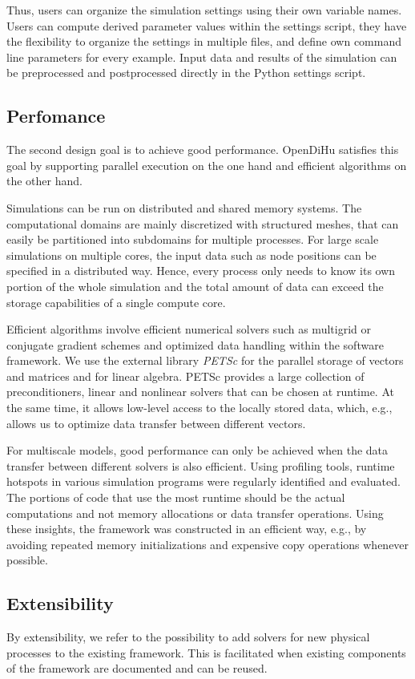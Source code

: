 Thus, users can organize the simulation settings using their own variable names.
Users can compute derived parameter values within the settings script, they have the flexibility to organize the settings in multiple files, and define own command line parameters for every example. Input data and results of the simulation can be preprocessed and postprocessed directly in the Python settings script.

\subsection{Perfomance}
The second design goal is to achieve good performance.
OpenDiHu satisfies this goal by supporting parallel execution on the one hand and efficient algorithms on the other hand. 

Simulations can be run on distributed and shared memory systems. The computational domains are mainly discretized with structured meshes, that can easily be partitioned into subdomains for multiple processes. For large scale simulations on multiple cores, the input data such as node positions can be specified in a distributed way. Hence, every process only needs to know its own portion of the whole simulation and the total amount of data can exceed the storage capabilities of a single compute core.

Efficient algorithms involve efficient numerical solvers such as multigrid or conjugate gradient schemes and optimized data handling within the software framework.
We use the external library \emph{PETSc} \cite{petsc-efficient1997} for the parallel storage of vectors and matrices and for linear algebra. PETSc provides a large collection of preconditioners, linear and nonlinear solvers that can be chosen at runtime. At the same time, it allows low-level access to the locally stored data, which, e.g., allows us to optimize data transfer between different vectors.

For multiscale models, good performance can only be achieved when the data transfer between different solvers is also efficient. Using profiling tools, runtime hotspots in various simulation programs were regularly identified and evaluated. The portions of code that use the most runtime should be the actual computations and not memory allocations or data transfer operations.
Using these insights, the framework was constructed in an efficient way, e.g., by avoiding repeated memory initializations and expensive copy operations whenever possible.

\subsection{Extensibility}
By extensibility, we refer to the possibility to add solvers for new physical processes to the existing framework.
This is facilitated when existing components of the framework are documented and can be reused. 

